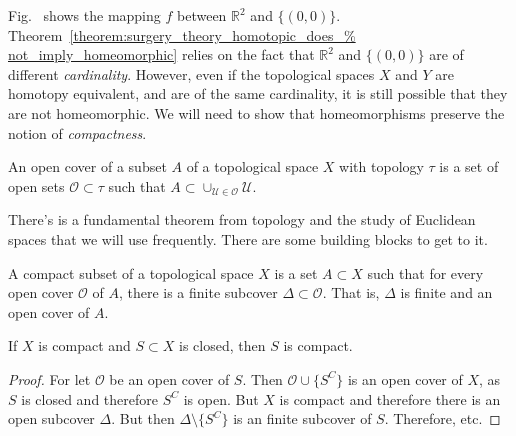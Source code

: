 \documentclass[crop=false,class=book,oneside]{standalone}
\begin{document}
            Fig.~
            shows the mapping $f$ between $\mathbb{R}^{2}$ and
            $\{(0,0)\}$.
            Theorem~\ref{theorem:surgery_theory_homotopic_does_%
                         not_imply_homeomorphic}
            relies on the fact that $\mathbb{R}^{2}$ and $\{(0,0)\}$
            are of different \textit{cardinality}. However, even
            if the topological spaces $X$ and $Y$ are homotopy
            equivalent, and are of the same cardinality, it is
            still possible that they are not homeomorphic.
            We will need to show that homeomorphisms preserve
            the notion of \textit{compactness}.
            \begin{definition}
                An open cover of a subset $A$ of a topological
                space $X$ with topology $\tau$
                is a set of open sets
                $\mathcal{O}\subset\tau$ such that
                $A\subset\cup_{\mathcal{U}\in\mathcal{O}}\mathcal{U}$.
            \end{definition}
            There's is a fundamental theorem from topology and
            the study of Euclidean spaces that we will use frequently.
            There are some building blocks to get to it.
            \begin{definition}
                A compact subset of a topological space $X$ is a
                set $A\subset{X}$ such that for every open cover
                $\mathcal{O}$ of $A$, there is a finite subcover
                $\Delta\subset\mathcal{O}$. That is,
                $\Delta$ is finite and an open cover of $A$.
            \end{definition}
            \begin{theorem}
                If $X$ is compact and
                $S\subset{X}$ is closed, then
                $S$ is compact.
            \end{theorem}
            \begin{proof}
                For let $\mathcal{O}$ be an open cover
                of $S$. Then
                $\mathcal{O}\cup\{S^{C}\}$ is an open
                cover of $X$, as $S$ is closed and therefore
                $S^{C}$ is open. But $X$ is compact and therefore
                there is an open subcover $\Delta$. But then
                $\Delta\setminus\{S^{C}\}$ is an finite subcover
                of $S$. Therefore, etc.
            \end{proof}
\end{document}
